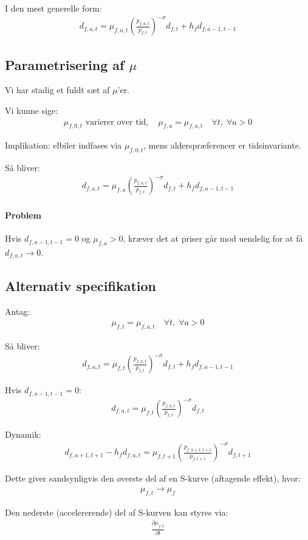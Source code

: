 \documentclass[12pt]{article}
\begin{document}
I den mest generelle form:
\begin{align}
d_{f,a,t} 
= \mu_{f,a,t} \left( \frac{p_{f,a,t}}{p_{f,t}} \right)^{-\sigma} d_{f,t} 
+ h_f d_{f,a-1,t-1}
\end{align}

\subsection*{Parametrisering af $\mu$}

Vi har stadig et fuldt sæt af $\mu$'er.

Vi kunne sige:
\begin{align}
\mu_{f,0,t} \text{ varierer over tid}, \quad 
\mu_{f,a} = \mu_{f,a,t} \quad \forall t, \; \forall a > 0
\end{align}

Implikation: elbiler indfases via $\mu_{f,0,t}$, mens alderspræferencer er tidsinvariante.

Så bliver:
\begin{align}
d_{f,a,t} 
= \mu_{f,a} \left( \frac{p_{f,a,t}}{p_{f,t}} \right)^{-\sigma} d_{f,t}
+ h_f d_{f,a-1,t-1}
\end{align}

\paragraph{Problem}
Hvis $d_{f,a-1,t-1} = 0$ og $\mu_{f,a} > 0$, kræver det at priser går mod uendelig for at få $d_{f,a,t} \to 0$.

\subsection*{Alternativ specifikation}

Antag:
\begin{align}
\mu_{f,t} = \mu_{f,a,t} \quad \forall t, \; \forall a > 0
\end{align}

Så bliver:
\begin{align}
d_{f,a,t} 
= \mu_{f,t} \left( \frac{p_{f,a,t}}{p_{f,t}} \right)^{-\sigma} d_{f,t}
+ h_f d_{f,a-1,t-1}
\end{align}

Hvis $d_{f,a-1,t-1} = 0$:
\begin{align}
d_{f,a,t} 
= \mu_{f,t} \left( \frac{p_{f,a,t}}{p_{f,t}} \right)^{-\sigma} d_{f,t}
\end{align}

Dynamik:
\begin{align}
d_{f,a+1,t+1} - h_f d_{f,a,t}
= \mu_{f,t+1} \left( \frac{p_{f,a+1,t+1}}{p_{f,t+1}} \right)^{-\sigma} d_{f,t+1}
\end{align}

Dette giver sandsynligvis den øverste del af en S-kurve (aftagende effekt), hvor:
\begin{align}
\mu_{f,t} \to \mu_f
\end{align}

Den nederste (accelererende) del af S-kurven kan styres via:
\begin{align}
\frac{\partial \mu_{f,t}}{\partial t}
\end{align}
\end{document}
